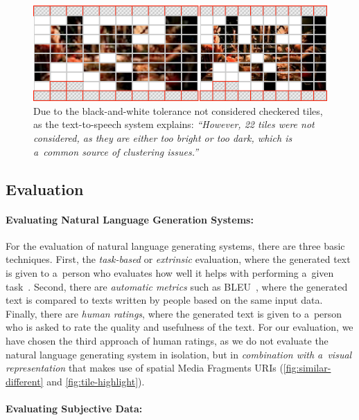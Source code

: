 \begin{figure}[!h]
  \centering
  \includegraphics[width=0.75\linewidth]{./tile-highlight.png}
  \caption[Due to the black-and-white tolerance not considered checkered tiles]{Due to the black-and-white tolerance not considered checkered tiles, as the text-to-speech system explains: \textit{``However, 22 tiles were not considered, as they are either too bright or too dark, which is a~common source of clustering issues.''}}
  \label{fig:tile-highlight}
\end{figure}

\subsection{Evaluation}
\label{sec:evaluation}

\paragraph{Evaluating Natural Language Generation Systems:}

For the evaluation of natural language generating systems,
there are three basic techniques.
First, the \emph{task-based} or \emph{extrinsic} evaluation,
where the generated text is given to a~person who evaluates
how well it helps with performing a~given task~\cite{portet2009nlg}.
Second, there are \emph{automatic metrics}
such as BLEU~\cite{papineni2002bleu}, where the generated text
is compared to texts written by people based on the same input data.
Finally, there are \emph{human ratings}, where the generated text
is given to a~person who is asked to rate the quality and usefulness of the text.
For our evaluation, we have chosen the third approach of human ratings,
as we do not evaluate the natural language generating system in isolation,
but in \emph{combination with a~visual representation}
that makes use of spatial Media Fragments URIs
(\autoref{fig:similar-different} and \autoref{fig:tile-highlight}).

\paragraph{Evaluating Subjective Data:}

